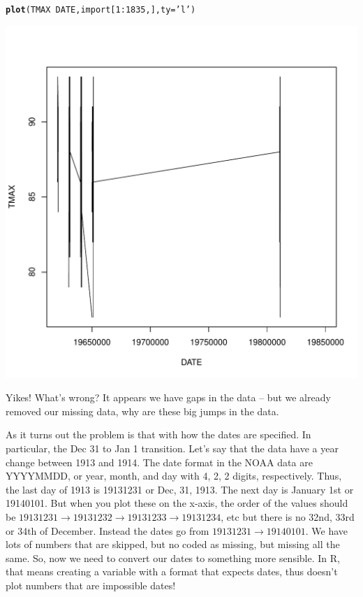 \documentclass{article}\usepackage[]{graphicx}\usepackage[]{color}
\makeatletter
\def\maxwidth{ %
  \ifdim\Gin@nat@width>\linewidth
    \linewidth
  \else
    \Gin@nat@width
  \fi
}
\newcommand{\hlnum}[1]{\textcolor[rgb]{0.686,0.059,0.569}{#1}}%
\newcommand{\hlstr}[1]{\textcolor[rgb]{0.192,0.494,0.8}{#1}}%
\newcommand{\hlopt}[1]{\textcolor[rgb]{0,0,0}{#1}}%
\newcommand{\hlstd}[1]{\textcolor[rgb]{0.345,0.345,0.345}{#1}}%
\newcommand{\hlkwc}[1]{\textcolor[rgb]{0.333,0.667,0.333}{#1}}%
\newcommand{\hlkwd}[1]{\textcolor[rgb]{0.737,0.353,0.396}{\textbf{#1}}}%
\newenvironment{kframe}{%
 \def\at@end@of@kframe{}%
 \ifinner\ifhmode%
  \def\at@end@of@kframe{\end{minipage}}%
  \begin{minipage}{\columnwidth}%
 \fi\fi%
 \def\FrameCommand##1{\hskip\@totalleftmargin \hskip-\fboxsep
 \colorbox{shadecolor}{##1}\hskip-\fboxsep
     \hskip-\linewidth \hskip-\@totalleftmargin \hskip\columnwidth}%
 \MakeFramed {\advance\hsize-\width
   \@totalleftmargin\z@ \linewidth\hsize
   \@setminipage}}%
 {\par\unskip\endMakeFramed%
 \at@end@of@kframe}
\newenvironment{knitrout}{}{} %
\makeatother
\begin{document}
\begin{knitrout}
\color{fgcolor}\begin{kframe}
\begin{alltt}
\hlkwd{plot}\hlstd{(TMAX}\hlopt{~}\hlstd{DATE, import[}\hlnum{1}\hlopt{:}\hlnum{1835}\hlstd{,],} \hlkwc{ty}\hlstd{=}\hlstr{'l'}\hlstd{)}
\end{alltt}
\end{kframe}
\includegraphics[width=\maxwidth]{figure/unnamed-chunk-9-1} 

\end{knitrout}

Yikes! What's wrong? It appears we have gaps in the data -- but we already removed our missing data, why are these big jumps in the data. 

As it turns out the problem is that with how the dates are specified. In particular, the Dec 31 to Jan 1 transition. Let's say that the data have a year change between 1913 and 1914. The date format in the NOAA data are YYYYMMDD, or year, month, and day with 4, 2, 2 digits, respectively. Thus, the last day of 1913 is 19131231 or Dec, 31, 1913. The next day is January 1st or 19140101. But when you plot these on the x-axis, the order of the values should be $19131231 \rightarrow 19131232 \rightarrow 19131233 \rightarrow 19131234$, etc but there is no 32nd, 33rd or 34th of December. Instead the dates go from  $19131231 \rightarrow 19140101$. We have lots of numbers that are skipped, but no coded as missing, but missing all the same. So, now we need to convert our dates to something more sensible. In R, that means creating a variable with a format that expects dates, thus doesn't plot numbers that are impossible dates!
\end{document}
